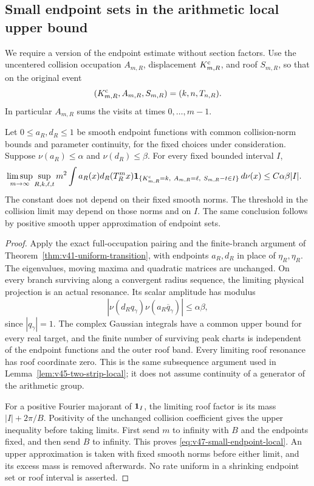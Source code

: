 \subsection{Small endpoint sets in the arithmetic local upper bound}
We require a version of the endpoint estimate without section factors.
Use the uncentered collision occupation $A_{m,R}$, displacement
$K^{\rm c}_{m,R}$, and roof $S_{m,R}$, so that on the original event
\[
 (K^{\rm c}_{m,R},A_{m,R},S_{m,R})=(k,n,T_{n,R}).
\]
In particular $A_{m,R}$ sums the visits at times $0,\ldots,m-1$.

\begin{lemma}
\label{lem:v47-small-endpoint-local}
Let $0\le a_R,d_R\le1$ be smooth endpoint functions with common
collision-norm bounds and parameter continuity, for the fixed choices
under consideration. Suppose $\nu(a_R)\le\alpha$ and
$\nu(d_R)\le\beta$. For every fixed bounded interval $I$,
\begin{align}
 &\limsup_{m\to\infty}\sup_{R,k,\ell,t}m^2
 \int a_R(x)d_R(T_R^m x)\one_{\{K^{\rm c}_{m,R}=k,\ A_{m,R}=\ell,\
                                      S_{m,R}-t\in I\}}\,d\nu(x)
                 \le C\alpha\beta |I|.
                                      \label{eq:v47-small-endpoint-local}
\end{align}
The constant does not depend on their fixed smooth norms. The
threshold in the collision limit may depend on those norms and on
$I$. The same conclusion follows by positive smooth upper
approximation of endpoint sets.
\end{lemma}
\begin{proof}
Apply the exact full-occupation pairing and the finite-branch argument
of Theorem~\ref{thm:v41-uniform-transition}, with endpoints $a_R,d_R$
in place of $\eta_R,\eta_R$. The eigenvalues, moving maxima and
quadratic matrices are unchanged. On every branch surviving along a
convergent radius sequence, the limiting physical projection is an
actual resonance. Its scalar amplitude has modulus
\[
 |\nu(d_R q_\gamma)\nu(a_R\overline q_\gamma)|
                                     \le\alpha\beta,
\]
since $|q_\gamma|=1$. The complex Gaussian integrals have a common
upper bound for every real target, and the finite number of surviving
peak charts is independent of the endpoint functions and the outer
roof band. Every limiting roof resonance has roof coordinate zero.
This is the same subsequence argument used in
Lemma~\ref{lem:v45-two-strip-local}; it does not assume continuity
of a generator of the arithmetic group.

For a positive Fourier majorant of $\mathbf1_I$, the limiting roof factor
is its mass $|I|+2\pi/B$. Positivity of the unchanged collision
coefficient gives the upper inequality before taking limits. First
send $m$ to infinity with $B$ and the endpoints fixed, and then send
$B$ to infinity. This proves \eqref{eq:v47-small-endpoint-local}.
An upper approximation is taken with fixed smooth norms before either
limit, and its excess mass is removed afterwards. No rate uniform in
a shrinking endpoint set or roof interval is asserted.
\end{proof}


